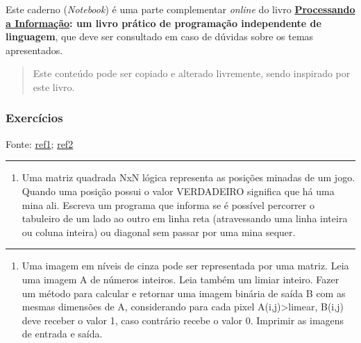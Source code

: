 \documentclass[12pt,a4paper]{article}
\renewcommand{\linethickness}{0.05em}
\providecommand{\tightlist}{%
      \setlength{\itemsep}{0pt}\setlength{\parskip}{0pt}}
\begin{document}
Este caderno (\emph{Notebook}) é uma parte complementar \emph{online} do
livro
\textbf{\href{https://editora.ufabc.edu.br/matematica-e-ciencias-da-computacao/58-processando-a-informacao}{Processando
a Informação}: um livro prático de programação independente de
linguagem}, que deve ser consultado em caso de dúvidas sobre os temas
apresentados.

\begin{quote}
Este conteúdo pode ser copiado e alterado livremente, sendo inspirado
por este livro.
\end{quote}

    \hypertarget{exercuxedcios}{%
\subsubsection{Exercícios}\label{exercuxedcios}}

Fonte:
\href{http://www.deinf.ufma.br/~csalles/prog/prog_lista2.pdf}{ref1};
\href{http://www.facom.ufu.br/~backes/wordpress/ListaC04.pdf}{ref2}

    \begin{center}\rule{0.5\linewidth}{\linethickness}\end{center}

\begin{enumerate}
\def\labelenumi{\arabic{enumi}.}
\tightlist
\item
  Uma matriz quadrada NxN lógica representa as posições minadas de um
  jogo. Quando uma posição possui o valor VERDADEIRO significa que há
  uma mina ali. Escreva um programa que informa se é possível percorrer
  o tabuleiro de um lado ao outro em linha reta (atravessando uma linha
  inteira ou coluna inteira) ou diagonal sem passar por uma mina sequer.
\end{enumerate}

    \begin{center}\rule{0.5\linewidth}{\linethickness}\end{center}

\begin{enumerate}
\def\labelenumi{\arabic{enumi}.}
\setcounter{enumi}{1}
\tightlist
\item
  Uma imagem em níveis de cinza pode ser representada por uma matriz.
  Leia uma imagem A de números inteiros. Leia também um limiar inteiro.
  Fazer um método para calcular e retornar uma imagem binária de saída B
  com as mesmas dimensões de A, considerando para cada pixel
  A(i,j)\textgreater{}limear, B(i,j) deve receber o valor 1, caso
  contrário recebe o valor 0. Imprimir as imagens de entrada e saída.
\end{enumerate}
\end{document}
